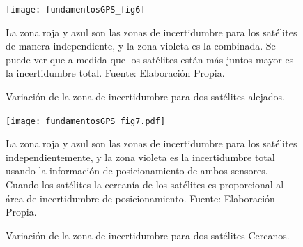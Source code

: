 \documentclass[10pt]{report}
\numberwithin{equation}{chapter}
\numberwithin{algorithm}{chapter}
\begin{document}
\begin{figure} 
\begin{center}
\texttt{[image: fundamentosGPS\_fig6]}
\caption{Variación de la zona de incertidumbre para dos satélites alejados.}
\scriptsize{La zona roja y azul son las zonas de incertidumbre para los satélites de manera independiente, y la zona violeta es la combinada. Se puede ver que a medida que los satélites están más juntos mayor es la incertidumbre total. Fuente: Elaboración Propia. }
\label{fundamentosGPS_fig6}
\end{center}
\end{figure}
\begin{figure} 
\begin{center}
\texttt{[image: fundamentosGPS\_fig7.pdf]} 
\caption{Variación de la zona de incertidumbre para dos satélites Cercanos.}
\scriptsize{La zona roja y azul son las zonas de incertidumbre para los satélites independientemente, y la zona violeta es la incertidumbre total usando la información de posicionamiento de ambos sensores. Cuando los satélites la cercanía de los satélites es proporcional al área de incertidumbre de posicionamiento. Fuente: Elaboración Propia. }
\label{fundamentosGPS_fig7}
\end{center}
\end{figure}
\end{document}
